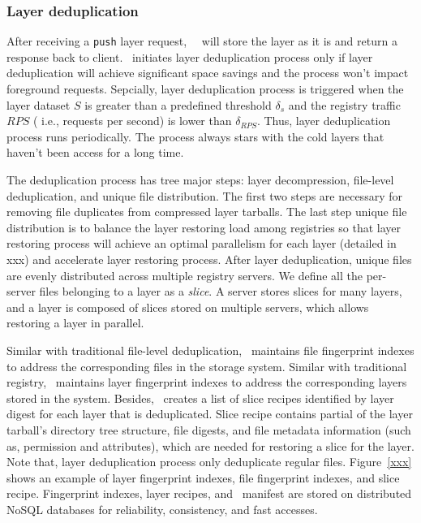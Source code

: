 \subsubsection{Layer deduplication}

After receiving a \texttt{push} layer request, \sysname~\dedupname~will store the layer as it is and return a response back to client. 
\dedupname~initiates layer deduplication process only if layer deduplication will achieve significant space savings and the process won't impact foreground requests. 
Sepcially, layer deduplication process is triggered when
the layer dataset $S$ is greater than a predefined threshold $\delta_{s}$ and the registry traffic $RPS$ ( i.e., requests per second) is lower than $\delta_{RPS}$. Thus, layer deduplication process runs periodically.
The process always stars with the cold layers that haven't been
access for a long time.
  
The deduplication process has tree major steps: layer decompression, file-level deduplication,
and unique file distribution. 
The first two steps are necessary for removing file duplicates from compressed layer tarballs.
The last step unique file distribution is to balance the layer restoring load among registries so that 
layer restoring process will achieve an optimal parallelism for each layer (detailed in xxx) and 
accelerate layer restoring process. 
After layer deduplication, unique files are evenly distributed across multiple registry servers. 
We define all the per-server files belonging to a layer as a {\em slice}. 
A server stores slices for many layers, and a layer is composed of slices stored on multiple servers, which allows restoring a layer in parallel. 

Similar with traditional file-level deduplication, \dedupname~maintains file fingerprint indexes to address the corresponding files in the storage system. 
Similar with traditional registry, \dedupname~maintains layer fingerprint indexes to address the corresponding layers stored in the system.
Besides, \dedupname~creates a list of slice recipes identified by layer digest for each layer that is deduplicated. 
Slice recipe contains partial of the layer tarball's directory tree structure, file digests, and file metadata information (such as, permission and attributes), which are needed for restoring a slice for the layer. Note that, layer deduplication process only deduplicate regular files.
Figure~\ref{xxx} shows an example of layer fingerprint indexes, file fingerprint indexes, and slice recipe.
Fingerprint indexes, layer recipes, and \sysname~manifest are stored on distributed NoSQL databases
for reliability, consistency, and fast accesses.

